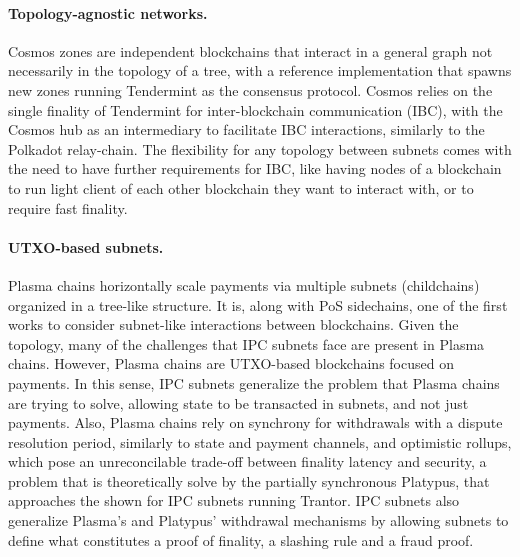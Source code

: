     \paragraph{Topology-agnostic networks.} Cosmos zones are independent blockchains that interact in a general graph not necessarily in the topology of a tree, with a reference implementation that spawns new zones running Tendermint as the consensus protocol. Cosmos relies on the single finality of Tendermint for inter-blockchain communication (IBC), with the Cosmos hub as an intermediary to facilitate IBC interactions, similarly to the Polkadot relay-chain. The flexibility for any topology between subnets comes with the need to have further requirements for IBC, like having nodes of a blockchain to run light client of each other blockchain they want to interact with, or to require fast finality. 

    \paragraph{UTXO-based subnets.} Plasma chains horizontally scale payments via multiple subnets (childchains) organized in a tree-like structure. It is, along with PoS sidechains, one of the first works to consider subnet-like interactions between blockchains. Given the topology, many of the challenges that IPC subnets face are present in Plasma chains. However, Plasma chains are UTXO-based blockchains focused on payments. In this sense, IPC subnets generalize the problem that Plasma chains are trying to solve, allowing state to be transacted in subnets, and not just payments. Also, Plasma chains rely on synchrony for withdrawals with a dispute resolution period, similarly to state and payment channels, and optimistic rollups, which pose an unreconcilable trade-off between finality latency and security, a problem that is theoretically solve by the partially synchronous Platypus, that approaches the \pof shown for IPC subnets running Trantor. IPC subnets also generalize Plasma's and Platypus' withdrawal mechanisms by allowing subnets to define what constitutes a proof of finality, a slashing rule and a fraud proof. 
    
